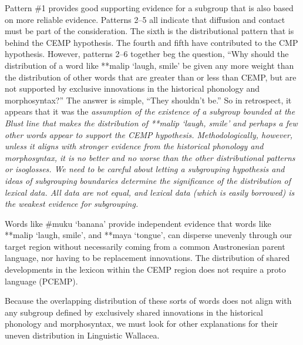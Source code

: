 Pattern {\#}1 provides good supporting evidence for a subgroup
that is also based on more reliable evidence.
Patterns 2--5 all indicate that diffusion
and contact must be part of the consideration.
The sixth is the distributional pattern that is behind the CEMP hypothesis.
The fourth and fifth have contributed to the CMP hypothesis.
However, patterns 2--6 together beg the question,
“Why should the distribution of a word like **malip ‘laugh,
smile’ be given any more weight than the distribution of other
words that are greater than or less than CEMP,
but are not supported by exclusive innovations in the historical
phonology and morphosyntax?” The answer is simple,
“They shouldn’t be.” 
So in retrospect, it appears that it was the \it{assumption}
of the existence of a subgroup bounded at the Blust line that
makes the distribution of **malip ‘laugh,
smile’ and perhaps a few other words appear to support the CEMP hypothesis.
Methodologically, however, unless it aligns with stronger evidence
from the historical phonology
and morphosyntax, it is no better
and no worse than the other distributional patterns or isoglosses.
We need to be careful about letting a subgrouping hypothesis
and ideas of subgrouping boundaries determine the significance
of the distribution of lexical data.
All data are not equal,
and lexical data (which is easily borrowed) is the weakest evidence for subgrouping.

Words like {\#}muku ‘banana’ provide independent evidence that
words like **malip ‘laugh,
smile’, and **maya ‘tongue’, can disperse unevenly through our
target region without necessarily coming from a common Austronesian
parent language, nor having to be replacement innovations.
The distribution of shared developments in the lexicon within
the CEMP region does not require a proto language (PCEMP).

Because the overlapping distribution of these sorts of words
does not align with any subgroup defined by exclusively shared
innovations in the historical phonology
and morphosyntax, we must look for other explanations for their
uneven distribution in Linguistic Wallacea.